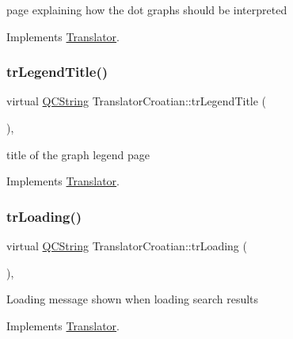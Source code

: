 page explaining how the dot graph\textquotesingle{}s should be interpreted 

Implements \mbox{\hyperlink{class_translator}{Translator}}.

\mbox{\label{class_translator_croatian_a3250a15c3aca1451a0c2b3e83a56be4f}} 
\subsubsection{\texorpdfstring{trLegendTitle()}{trLegendTitle()}}
{\footnotesize\ttfamily virtual \mbox{\hyperlink{class_q_c_string}{Q\+C\+String}} Translator\+Croatian\+::tr\+Legend\+Title (\begin{DoxyParamCaption}{ }\end{DoxyParamCaption})\hspace{0.3cm}{\ttfamily [inline]}, {\ttfamily [virtual]}}

title of the graph legend page 

Implements \mbox{\hyperlink{class_translator}{Translator}}.

\mbox{\label{class_translator_croatian_a8132d4a84802c0fa136e950b12519919}} 
\subsubsection{\texorpdfstring{trLoading()}{trLoading()}}
{\footnotesize\ttfamily virtual \mbox{\hyperlink{class_q_c_string}{Q\+C\+String}} Translator\+Croatian\+::tr\+Loading (\begin{DoxyParamCaption}{ }\end{DoxyParamCaption})\hspace{0.3cm}{\ttfamily [inline]}, {\ttfamily [virtual]}}

Loading message shown when loading search results 

Implements \mbox{\hyperlink{class_translator}{Translator}}.

\mbox{\label{class_translator_croatian_a3b36b638e21764633745594e5677d4e6}} 
